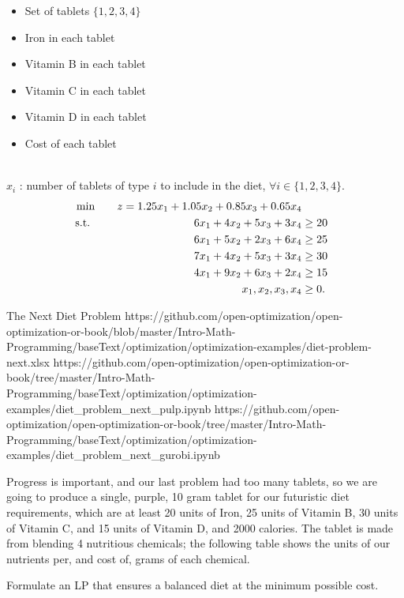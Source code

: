 \begin{solution}
\smallskip {}
\begin{itemize}
\item Set of tablets $\{1,2,3,4\}$
\end{itemize}

\smallskip {}
\begin{itemize}
\item Iron in each tablet
\item Vitamin B in each tablet
\item Vitamin C in each tablet
\item Vitamin D in each tablet
\item Cost of each tablet
\end{itemize}

\smallskip  {} \\
$x_i$ : number of tablets of type $i$ to include in the diet, $\forall i \in \{1,2,3,4\}$.\\

\smallskip  {}
\begin{align*}
\min \quad && z = 1.25x_1 + 1.05x_2 + 0.85x_3 + 0.65x_4 \\
\mbox{ s.t. } \quad &&  6x_1 + 4x_2 + 5x_3 + 3x_4 &\ge 20  \\
&& 6x_1 + 5x_2 + 2x_3 + 6x_4 &\ge 25 \\
&& 7x_1 + 4x_2 + 5x_3 + 3x_4 &\ge 30 \\
&& 4x_1 + 9x_2 + 6x_3 + 2x_4 &\ge 15  \\
&& x_1, x_2, x_3, x_4 &\ge 0. 
\end{align*}
\end{solution}


\begin{examplewithallcode}{The Next Diet Problem}
{https://github.com/open-optimization/open-optimization-or-book/blob/master/Intro-Math-Programming/baseText/optimization/optimization-examples/diet-problem-next.xlsx}
{https://github.com/open-optimization/open-optimization-or-book/tree/master/Intro-Math-Programming/baseText/optimization/optimization-examples/diet_problem_next_pulp.ipynb}
{https://github.com/open-optimization/open-optimization-or-book/tree/master/Intro-Math-Programming/baseText/optimization/optimization-examples/diet_problem_next_gurobi.ipynb}

Progress is important, and our last problem had too many tablets, so we are going to produce a single, purple, 10 gram tablet for our futuristic diet requirements, which are at least 20 units of Iron, 25 units of Vitamin B, 30 units of Vitamin C, and 15 units of Vitamin D, and 2000 calories. The tablet is made from blending 4 nutritious chemicals; the following table shows the units of our nutrients per, and cost of, grams of each chemical.

Formulate an LP that ensures a balanced diet at the minimum possible cost.
\end{examplewithallcode}

